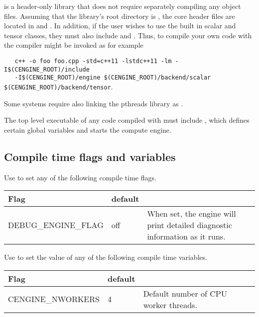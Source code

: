 \Cengine{} is a header-only library that does not require separately compiling any object files. 
Assuming that the library's root directory is , the core header files 
are located in  and . 
In addition, if the user wishes to use the built in scalar and tensor classes, they must also 
include  and . 
Thus, to compile your own code  with \Cengine{} the compiler might be invoked as for example 

\texttt{~~~c++ -o foo foo.cpp -std=c++11 -lstdc++11 -lm -I\$(CENGINE\_ROOT)/include\\ 
\mbox{}~~~-I\$(CENGINE\_ROOT)/engine 
\$(CENGINE\_ROOT)/backend/scalar \$(CENGINE\_ROOT)/backend/tensor}. 

Some systems require also linking the pthreads library as . 

The top level executable of any code compiled with \Cengine{} must include , which 
defines certain global variables and starts the compute engine. 

\subsection*{Compile time flags and variables}

Use  to set any of the following compile time flags. 

\begin{tabularx}{\textwidth}{|l|l|X|}
\hline
Flag&default&\\
\hline
\hline 
DEBUG\_ENGINE\_FLAG & off & When set, the engine will print detailed diagnostic information as it runs. \\
\hline 
\end{tabularx}
\bigskip

Use  to set the value of any of the following compile time variables. 

\begin{tabularx}{\textwidth}{|l|l|X|}
\hline
Flag&default&\\
\hline
\hline 
CENGINE\_NWORKERS& 4 & Default number of CPU worker threads.\\
\hline 
\end{tabularx}